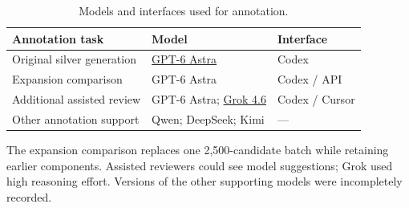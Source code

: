 \documentclass[fleqn,12pt]{wlpeerj}
\begin{document}
\setcounter{table}{18}
\begin{table}[!htbp]
\centering\small
\caption{Models and interfaces used for annotation.}
\label{tab:annotation-models}
\begin{tabularx}{\linewidth}{@{}P{.30\linewidth}L P{.23\linewidth}@{}}
\toprule
Annotation task & Model & Interface \\
\midrule
Original silver generation & \href{https://developers.openai.com/api/docs/models/gpt-6-astra}{GPT-6 Astra} & Codex \\
Expansion comparison & GPT-6 Astra & Codex / API \\
Additional assisted review & GPT-6 Astra; \href{https://docs.x.ai/developers/models/grok-4.6}{Grok 4.6} & Codex / Cursor \\
Other annotation support & Qwen; DeepSeek; Kimi & --- \\
\bottomrule
\end{tabularx}
\par\smallskip\footnotesize\RaggedRight
The expansion comparison replaces one 2,500-candidate batch while retaining earlier components. Assisted reviewers could see model suggestions; Grok used high reasoning effort. Versions of the other supporting models were incompletely recorded.
\end{table}

\end{document}
